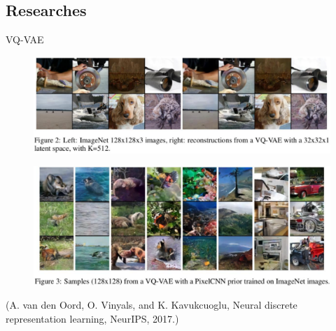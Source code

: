 \subsection{Researches}

\begin{frame}[allowframebreaks]

\begin{myconceptblock}{11.23}{VQ-VAE}
    \begin{figure}[H]
        \centering
        \includegraphics[width=1.0\textwidth]{.././assets/11.8.png}
    \end{figure}

    \begin{figure}[H]
        \centering
        \includegraphics[width=1.0\textwidth]{.././assets/11.9.png}
    \end{figure}

    (A. van den Oord, O. Vinyals, and K. Kavukcuoglu, Neural discrete representation learning, NeurIPS, 2017.)
\end{myconceptblock}

\end{frame}

